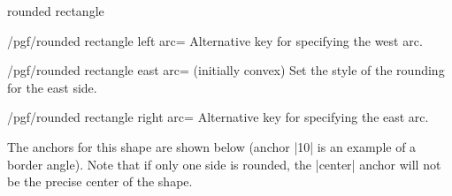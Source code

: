 \begin{shape}{rounded rectangle}
\begin{stylekey}{/pgf/rounded rectangle left arc=}
	Alternative key for specifying the west arc.
\end{stylekey}

\begin{key}{/pgf/rounded rectangle east arc= (initially convex)}
	Set the style of the rounding for the east side.
\end{key}

\begin{stylekey}{/pgf/rounded rectangle right arc=}
	Alternative key for specifying the east arc.
\end{stylekey}

	The anchors for this shape are shown below (anchor |10| is an example
	of a border angle). Note that if only one side is rounded, the
	|center| anchor will not be the precise center of the shape.
	
\begin{codeexample}[]
\Huge
{}
\end{codeexample}

\end{shape}


